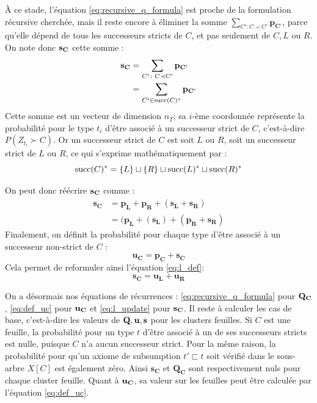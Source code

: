 À ce stade, l'équation \ref{eq:recursive_q_formula} est proche de la formulation récursive cherchée, mais il reste encore à éliminer la somme $\sum_{C' \colon C \prec C'} \mathbf{p_{C'}}$, parce qu'elle dépend de tous les successeurs stricts de $C$, et pas seulement de $C, L$ ou $R$. On note donc $\bf{s_C}$ cette somme :
\begin{align}
    \bf{s_C} &= \sum_{C' \colon C \prec C'} \mathbf{p_{C'}} \nonumber \\
            &= \sum_{C' \in \succs(C)^*} \mathbf{p_{C'}}
\end{align}
Cette somme est un vecteur de dimension $n_T$; sa $i$-ème coordonnée représente la probabilité pour le type $t_i$ d'être associé à un successeur strict de $C$, c'est-à-dire $P(Z_{t_i} \succ C)$. Or un successeur strict de $C$ est soit $L$ ou $R$, soit un successeur strict de $L$ ou $R$, ce qui s'exprime mathématiquement par :
\begin{equation}
    \succs(C)^* = \{L\} \sqcup \{R\} \sqcup \succs(L)^* \sqcup \succs(R)^*
\end{equation}

On peut donc réécrire $\bf{s_C}$ comme :
\begin{align}
    \mathbf{s_C} &= \mathbf{p_L} + \mathbf{p_R} + (\mathbf{s_L} + \mathbf{s_R}) \nonumber  \\
     &= (\mathbf{p_L}  + (\mathbf{s_L}) + (\mathbf{p_R} + \mathbf{s_R})
    \label{eq:l_def}
\end{align}
Finalement, on définit la probabilité pour chaque type d'être associé à un successeur non-strict de $C$ : 
\begin{equation}
    \mathbf{u_C} = \mathbf{p_C} + \mathbf{s_C}
    \label{eq:def_uc}
\end{equation}
Cela permet de reformuler ainsi l'équation \ref{eq:l_def}:
\begin{equation}
    \mathbf{s_C} = \mathbf{u_L} + \mathbf{u_R}
    \label{eq:l_update}
\end{equation}

On a désormais nos équations de récurrences : \ref{eq:recursive_q_formula} pour $\bf{Q_C}$, \ref{eq:def_uc} pour $\bf{u_C}$ et \ref{eq:l_update} pour $\bf{s_C}$. Il reste à calculer les cas de base, c'est-à-dire les valeurs de $\bf{Q, u, s}$ pour les clusters feuilles. Si $C$ est une feuille, la probabilité pour un type $t$ d'être associé à un de ses successeurs stricts est nulle, puisque $C$ n'a aucun successeur strict. Pour la même raison, la probabilité pour qu'un axiome de subsumption $t' \sqsubset t$ soit vérifié dans le sous-arbre $X[C]$ est également zéro. Ainsi $\mathbf{s_C}$ et $\mathbf{Q_C}$ sont respectivement nuls pour chaque cluster feuille. Quant à $\bf{u_C}$, sa valeur sur les feuilles peut être calculée par l'équation \ref{eq:def_uc}.


